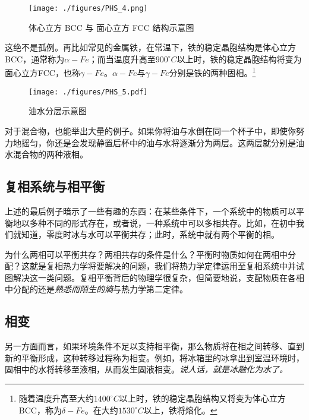 \begin{figure}[ht]
\centering
\texttt{[image: ./figures/PHS\_4.png]}
\caption{体心立方 BCC 与 面心立方 FCC 结构示意图} \label{PHS_fig4}
\end{figure}
这绝不是孤例。再比如常见的金属铁，在常温下，铁的稳定晶胞结构是体心立方BCC，通常称为$\alpha-Fe$；而当温度升高至$900 ^\circ C$以上时，铁的稳定晶胞结构将变为面心立方FCC，也称$\gamma-Fe$。$\alpha-Fe$与$\gamma-Fe$分别是铁的两种固相。\footnote{随着温度升高至大约$1400 ^\circ C$以上时，铁的稳定晶胞结构又将变为体心立方BCC，称为$\delta - Fe$。在大约$1530 ^\circ C$以上，铁将熔化。}

\begin{figure}[ht]
\centering
\texttt{[image: ./figures/PHS\_5.pdf]}
\caption{油水分层示意图} \label{PHS_fig5}
\end{figure}
对于混合物，也能举出大量的例子。如果你将油与水倒在同一个杯子中，即使你努力地摇匀，你还是会发现静置后杯中的油与水将逐渐分为两层。这两层就分别是油水混合物的两种液相。


\subsection{复相系统与相平衡}
上述的最后例子暗示了一些有趣的东西：在某些条件下，一个系统中的物质可以平衡地以多种不同的形式存在，或者说，一种系统中可以多相共存。比如，在初中我们就知道，零度时冰与水可以平衡共存；此时，系统中就有两个平衡的相。


为什么两相可以平衡共存？两相共存的条件是什么？平衡时物质如何在两相中分配？这就是复相热力学将要解决的问题，我们将热力学定律运用至复相系统中并试图解决这一类问题。复相平衡背后的物理学很复杂，但简要地说，支配物质在各相中分配的还是\textsl{熟悉而陌生的熵}与热力学第二定律。

\subsection{相变}
另一方面而言，如果环境条件不足以支持相平衡，那么物质将在相之间转移、直到新的平衡形成，这种转移过程称为相变。例如，将冰箱里的冰拿出到室温环境时，固相中的水将转移至液相，从而发生固液相变。\textsl{说人话，就是冰融化为水了。}
